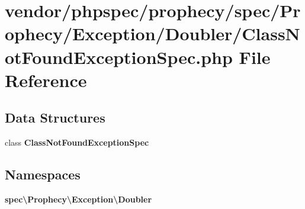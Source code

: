\section{vendor/phpspec/prophecy/spec/\+Prophecy/\+Exception/\+Doubler/\+Class\+Not\+Found\+Exception\+Spec.php File Reference}
\label{prophecy_2spec_2_prophecy_2_exception_2_doubler_2_class_not_found_exception_spec_8php}
\subsection*{Data Structures}
\begin{DoxyCompactItemize}
\item 
class {\bf Class\+Not\+Found\+Exception\+Spec}
\end{DoxyCompactItemize}
\subsection*{Namespaces}
\begin{DoxyCompactItemize}
\item 
 {\bf spec\textbackslash{}\+Prophecy\textbackslash{}\+Exception\textbackslash{}\+Doubler}
\end{DoxyCompactItemize}
